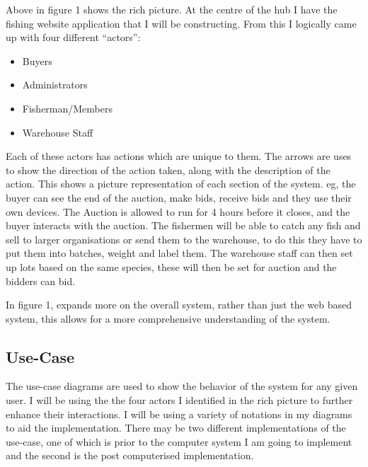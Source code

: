 \documentclass{article}
\begin{document}
\noindent Above in figure 1 shows the rich picture. At the centre of the hub I have the fishing website application that I will be constructing. From this I logically came up with four different ``actors'':
\begin{itemize}
	\item Buyers
	\item Administrators
	\item Fisherman/Members
	\item Warehouse Staff
\end{itemize}
Each of these actors has actions which are unique to them. The arrows are uses to show the direction of the action taken, along with the description of the action. This shows a picture representation of each section of the system. eg, the buyer can see the end of the auction, make bids, receive bids and they use their own devices. The Auction is allowed to run for 4 hours before it closes, and the buyer interacts with the auction. The fishermen will be able to catch any fish and sell to larger organisations or send them to the warehouse, to do this they have to put them into batches, weight and label them. The warehouse staff can then set up lots based on the same species, these will then be set for auction and the bidders can bid.

In figure 1, expands more on the overall system, rather than just the web based system, this allows for a more comprehensive understanding of the system.

\subsection{Use-Case}
The use-case diagrams are used to show the behavior of the system for any given user. I will be using the the four actors I identified in the rich picture to further enhance their interactions. I will be using a variety of notations in my diagrams to aid the implementation. There may be two different implementations of the use-case, one of which is prior to the computer system I am going to implement and the second is the post computerised implementation.
\end{document}

